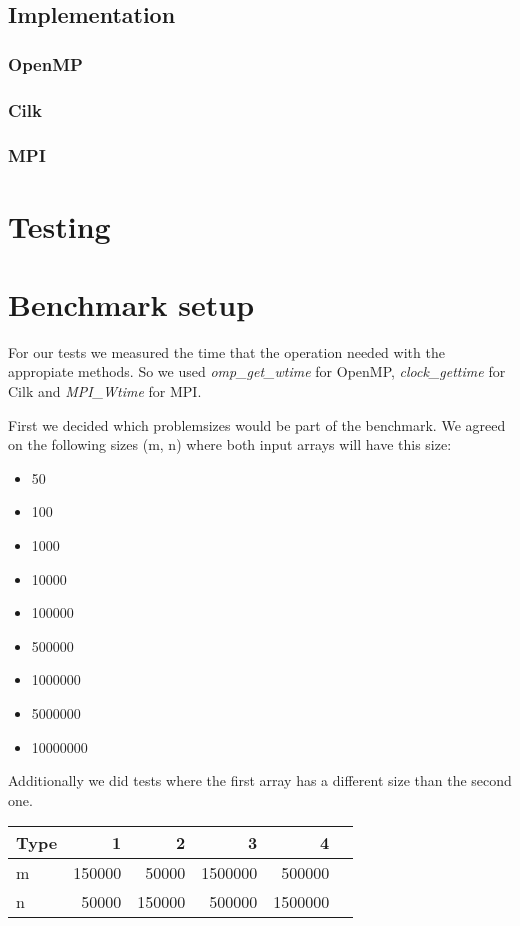 \documentclass[12pt,a4paper,titlepage,oneside]{scrartcl}
\begin{document}
\subsection{Implementation}

\subsubsection{OpenMP}

\subsubsection{Cilk}

\subsubsection{MPI}

\section{Testing}

\section{Benchmark setup}
For our tests we measured the time that the operation needed with the appropiate methods. So we used \textit{omp\_get\_wtime} for OpenMP, \textit{clock\_gettime} for Cilk and \textit{MPI\_Wtime} for MPI.

First we decided which problemsizes would be part of the benchmark. We agreed on the following sizes (m, n) where both input arrays will have this size:

\begin{multicols}{3}
\begin{itemize}
\item 50
\item 100
\item 1000
\item 10000
\item 100000
\item 500000
\item 1000000
\item 5000000
\item 10000000
\end{itemize}
\end{multicols}

Additionally we did tests where the first array has a different size than the second one.
\begin{center}
\begin{tabular}{l | r | r | r | r | r}
\hline
 Type & 1 & 2 & 3 & 4 \\ \hline
 m & 150000 & 50000 & 1500000 & 500000 \\ \hline
 n & 50000 & 150000 & 500000 & 1500000 \\ \hline
\end{tabular}
\end{center}
\end{document}
